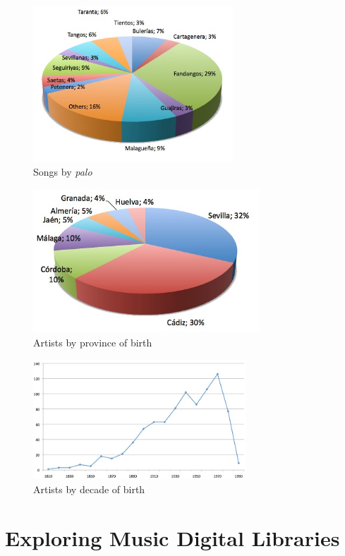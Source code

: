\begin{figure}[!ht]
    \centering
    \includegraphics[width=7.5cm]{ch05_musicology/pics/Songs-by-palo.jpg}
    \caption{Songs by \textit{palo} 
    \label{fig:musicology:graph-palo}}
\end{figure}


\begin{figure}[!ht]
	\centering
	\includegraphics[width=8.5cm]{ch05_musicology/pics/Artists-by-province.jpg}
	\caption{Artists by province of birth 
	\label{fig:musicology:graph-province}}
\end{figure}


\begin{figure}[!ht]
	\centering
	\includegraphics[width=8cm]{ch05_musicology/pics/Artists-by-decade-of-birth.jpg}
	\caption{Artists by decade of birth 
	\label{fig:musicology:graph-decade}}
\end{figure}


\section{Exploring Music Digital Libraries}

